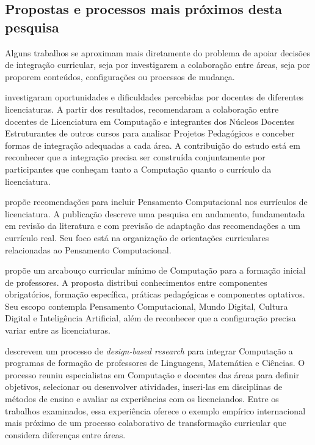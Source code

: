 \subsection{Propostas e processos mais próximos desta pesquisa}
\label{subsec}

Alguns trabalhos se aproximam mais diretamente do problema de apoiar decisões de integração curricular, seja por investigarem a colaboração entre áreas, seja por proporem conteúdos, configurações ou processos de mudança.

 investigaram oportunidades e dificuldades percebidas por docentes de diferentes licenciaturas. A partir dos resultados, recomendaram a colaboração entre docentes de Licenciatura em Computação e integrantes dos Núcleos Docentes Estruturantes de outros cursos para analisar Projetos Pedagógicos e conceber formas de integração adequadas a cada área. A contribuição do estudo está em reconhecer que a integração precisa ser construída conjuntamente por participantes que conheçam tanto a Computação quanto o currículo da licenciatura.

 propõe recomendações para incluir Pensamento Computacional nos currículos de licenciatura. A publicação descreve uma pesquisa em andamento, fundamentada em revisão da literatura e com previsão de adaptação das recomendações a um currículo real. Seu foco está na organização de orientações curriculares relacionadas ao Pensamento Computacional.

 propõe um arcabouço curricular mínimo de Computação para a formação inicial de professores. A proposta distribui conhecimentos entre componentes obrigatórios, formação específica, práticas pedagógicas e componentes optativos. Seu escopo contempla Pensamento Computacional, Mundo Digital, Cultura Digital e Inteligência Artificial, além de reconhecer que a configuração precisa variar entre as licenciaturas.

 descrevem um processo de \textit{design-based research} para integrar Computação a programas de formação de professores de Linguagens, Matemática e Ciências. O processo reuniu especialistas em Computação e docentes das áreas para definir objetivos, selecionar ou desenvolver atividades, inseri-las em disciplinas de métodos de ensino e avaliar as experiências com os licenciandos. Entre os trabalhos examinados, essa experiência oferece o exemplo empírico internacional mais próximo de um processo colaborativo de transformação curricular que considera diferenças entre áreas.

